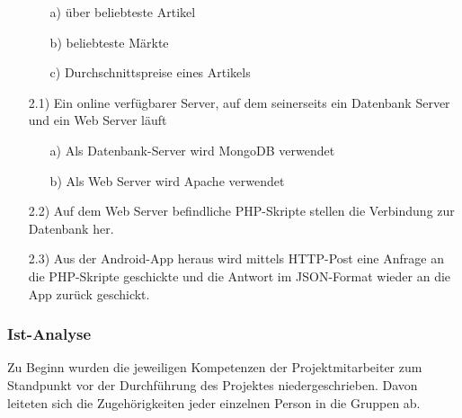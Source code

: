 \documentclass[12pt,a4paper]{article}
\begin{document}
\begin{itemize}
 \begin{itemize}
\item[a)]über beliebteste Artikel
\item[b)] beliebteste Märkte
\item[c)] Durchschnittspreise eines Artikels
\end{itemize}
 \item[2.1)] Ein online verfügbarer Server, auf dem seinerseits ein Datenbank Server und ein Web Server läuft
 \begin{itemize}
\item[a)]Als Datenbank-Server wird MongoDB verwendet
\item[b)]Als Web Server wird Apache verwendet
\end{itemize}
\item[2.2)] Auf dem Web Server befindliche PHP-Skripte stellen die Verbindung zur Datenbank her.
\item[2.3)] Aus der Android-App heraus wird mittels HTTP-Post eine Anfrage an die PHP-Skripte geschickte und die Antwort im JSON-Format wieder an die App zurück geschickt.
\end{itemize}
\newpage

\subsubsection{Ist-Analyse}
Zu Beginn wurden die jeweiligen Kompetenzen der Projektmitarbeiter zum Standpunkt vor der Durchführung des Projektes niedergeschrieben. Davon leiteten sich die Zugehörigkeiten jeder einzelnen Person in die Gruppen ab.\\
\newline
\end{document}
